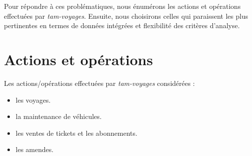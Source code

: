 \documentclass[a4paper,12pt]{report}
\begin{document}
Pour répondre à ces problématiques, nous énumérons les actions et opérations effectuées par \textit{tam-voyages}. Ensuite, nous choisirons celles qui paraissent les plus pertinentes en termes de données intégrées et flexibilité des critères d'analyse.

\section{Actions et opérations}
Les actions/opérations effectuées par \textit{tam-voyages} considérées :
\begin{itemize}
  \item les voyages.
  \item la maintenance de véhicules.
  \item les ventes de tickets et les abonnements.
  \item les amendes.
\end{itemize}
\end{document}
